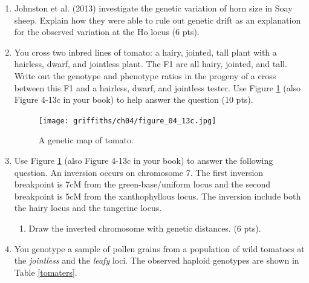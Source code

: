 \documentclass[]{article}
\begin{document}
\begin{enumerate}
\newpage
\item Johnston et al. (2013) investigate the genetic variation of horn size in Soay sheep. Explain how they were able to rule out genetic drift as an explanation for the observed variation at the Ho locus (6 pts).

\newpage
\item You cross two inbred lines of tomato: a hairy, jointed, tall plant with a hairless, dwarf, and jointless plant.  The F1 are all hairy, jointed, and tall.  Write out the genotype and phenotype ratios in the progeny of a cross between this F1 and a hairless, dwarf, and jointless tester.  Use Figure \ref{map} (also Figure 4-13c in your book) to help answer the question (10 pts).

\begin{figure}[h]
  \begin{center}
   \texttt{[image: griffiths/ch04/figure\_04\_13c.jpg]}
    \caption{A genetic map of tomato. } 
\label{map}
  \end{center}
\end{figure}


\newpage
\item Use Figure \ref{map} (also Figure 4-13c in your book) to answer the following question. An inversion occurs on chromosome 7.  The first inversion breakpoint is 7cM from the green-base/uniform locus and the second breakpoint is 5cM from the xanthophyllous locus. The inversion include both the hairy locus and the tangerine locus. 

\begin{enumerate}
\item Draw the inverted chromosome with genetic distances. (6 pts).
\end{enumerate}

\newpage
\item You genotype a sample of pollen grains from a population of wild tomatoes at the \emph{jointless} and the \emph{leafy} loci. The observed haploid genotypes are shown in Table \ref{tomaters}. 


\end{enumerate}
\end{document}
